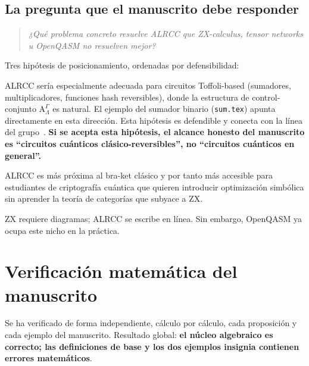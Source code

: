 \documentclass[12pt, a4paper]{article}
\newcommand{\gate}[1]{\text{#1}}
\newcommand{\stategate}[3]{\gate{#1}^{#2}_{#3}}
\begin{document}
\subsection{La pregunta que el manuscrito debe responder}

\begin{quote}
  \textit{¿Qué problema concreto resuelve ALRCC que ZX-calculus, tensor
    networks u OpenQASM no resuelven mejor?}
\end{quote}

Tres hipótesis de posicionamiento, ordenadas por defensibilidad:

\begin{description}[leftmargin=2cm, style=nextline]
  \item[(H1) Circuitos clásico-reversibles en criptografía cuántica.]
        ALRCC sería especialmente adecuada para circuitos Toffoli-based
        (sumadores, multiplicadores, funciones hash reversibles), donde la
        estructura de control-conjunto $\stategate{A}{\Gamma}{\Lambda}$ es
        natural. El ejemplo del sumador binario (\texttt{sum.tex}) apunta
        directamente en esta dirección. Esta hipótesis es defendible y conecta
        con la línea del grupo~\cite{reina2024ix}.
        \textbf{Si se acepta esta hipótesis, el alcance honesto del manuscrito
          es ``circuitos cuánticos clásico-reversibles'', no ``circuitos cuánticos
          en general''.}

  \item[(H2) Notación pedagógica / algebraica accesible.]
        ALRCC es más próxima al bra-ket clásico y por tanto más accesible para
        estudiantes de criptografía cuántica que quieren introducir optimización
        simbólica sin aprender la teoría de categorías que subyace a ZX.

  \item[(H3) Sintaxis lineal en \LaTeX / texto plano.]
        ZX requiere diagramas; ALRCC se escribe en línea. Sin embargo,
        OpenQASM ya ocupa este nicho en la práctica.
\end{description}

\section{Verificación matemática del manuscrito}
\label{sec:verificacion}

Se ha verificado de forma independiente, cálculo por cálculo, cada
proposición y cada ejemplo del manuscrito. Resultado global: \textbf{el
  núcleo algebraico es correcto; las definiciones de base y los dos ejemplos
  insignia contienen errores matemáticos}.
\end{document}
